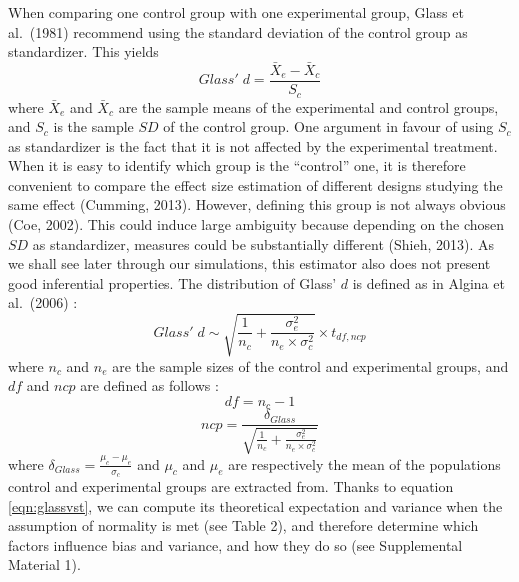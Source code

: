 \documentclass[
  english,
  man,floatsintext]{apa6}
\begin{document}
When comparing one control group with one experimental group, Glass et al.~(1981) recommend using the standard deviation of the control group as standardizer. This yields
\begin{equation*} 
Glass' \; d = \frac{\bar{X}_{e} - \bar{X}_{c}}{S_{c}}
\label{eqn:Glassds}
\end{equation*}
where \(\bar{X}_{e}\) and \(\bar{X}_{c}\) are the sample means of the experimental and control groups, and \(S_{c}\) is the sample \(SD\) of the control group. One argument in favour of using \(S_c\) as standardizer is the fact that it is not affected by the experimental treatment. When it is easy to identify which group is the ``control'' one, it is therefore convenient to compare the effect size estimation of different designs studying the same effect (Cumming, 2013). However, defining this group is not always obvious (Coe, 2002). This could induce large ambiguity because depending on the chosen \(SD\) as standardizer, measures could be substantially different (Shieh, 2013). As we shall see later through our simulations, this estimator also does not present good inferential properties. The distribution of Glass' \(d\) is defined as in Algina et al.~(2006) :
\begin{equation} 
Glass' \; d \sim \sqrt{\frac{1}{n_{c}}+\frac{\sigma_{e}^2}{n_{e} \times \sigma^2_{c}}} \times t_{df,ncp}
\label{eqn:glassvst}
\end{equation}
where \(n_c\) and \(n_e\) are the sample sizes of the control and experimental groups, and \(df\) and \(ncp\) are defined as follows :
\begin{equation} 
df = n_{c}-1
\label{eqn:glassdf}
\end{equation}
\begin{equation*} 
ncp = \frac{\delta_{Glass}}{\sqrt{\frac{1}{n_{c}} + \frac{\sigma_{e}^2}{n_{e} \times \sigma^2_{c}}}}
\label{eqn:glassncp}
\end{equation*}
where \(\delta_{Glass} = \frac{\mu_{c}-\mu_{e}}{\sigma_{c}}\) and \(\mu_c\) and \(\mu_e\) are respectively the mean of the populations control and experimental groups are extracted from. Thanks to equation \ref{eqn:glassvst}, we can compute its theoretical expectation and variance when the assumption of normality is met (see Table 2), and therefore determine which factors influence bias and variance, and how they do so (see Supplemental Material 1).
\end{document}
